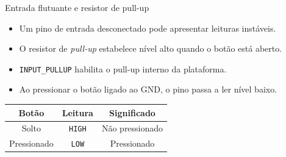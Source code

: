 \begin{frame}[t]{Entrada flutuante e resistor de pull-up}
\begin{itemize}
\item Um pino de entrada desconectado pode apresentar leituras instáveis.
\item O resistor de \textit{pull-up} estabelece nível alto quando o botão está aberto.
\item \texttt{INPUT\_PULLUP} habilita o pull-up interno da plataforma.
\item Ao pressionar o botão ligado ao GND, o pino passa a ler nível baixo.
\end{itemize}
\begin{center}\begin{tabular}{ccc}\toprule
Botão & Leitura & Significado\\\midrule
Solto & \texttt{HIGH} & Não pressionado\\
Pressionado & \texttt{LOW} & Pressionado\\\bottomrule
\end{tabular}\end{center}
\end{frame}

